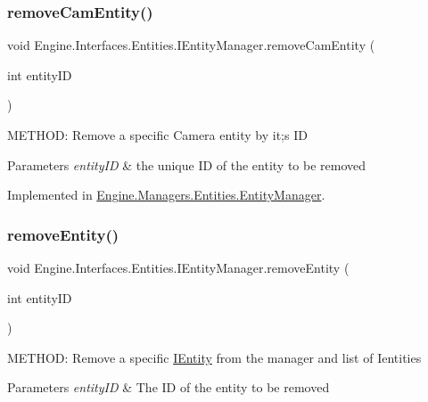 \subsubsection{\texorpdfstring{remove\+Cam\+Entity()}{removeCamEntity()}}
{\footnotesize\ttfamily void Engine.\+Interfaces.\+Entities.\+I\+Entity\+Manager.\+remove\+Cam\+Entity (\begin{DoxyParamCaption}\item[{int}]{entity\+ID }\end{DoxyParamCaption})}



M\+E\+T\+H\+OD\+: Remove a specific Camera entity by it;s ID 


\begin{DoxyParams}{Parameters}
{\em entity\+ID} & the unique ID of the entity to be removed\\
\hline
\end{DoxyParams}


Implemented in \hyperlink{a00518_a5f4c775a02bbb9057577780643a7b068}{Engine.\+Managers.\+Entities.\+Entity\+Manager}.

\mbox{\label{a00442_a13b425137cec67f2df4e65e8d08c531b}} 
\subsubsection{\texorpdfstring{remove\+Entity()}{removeEntity()}}
{\footnotesize\ttfamily void Engine.\+Interfaces.\+Entities.\+I\+Entity\+Manager.\+remove\+Entity (\begin{DoxyParamCaption}\item[{int}]{entity\+ID }\end{DoxyParamCaption})}



M\+E\+T\+H\+OD\+: Remove a specific \hyperlink{a00438}{I\+Entity} from the manager and list of Ientities 


\begin{DoxyParams}{Parameters}
{\em entity\+ID} & The ID of the entity to be removed\\
\hline
\end{DoxyParams}


